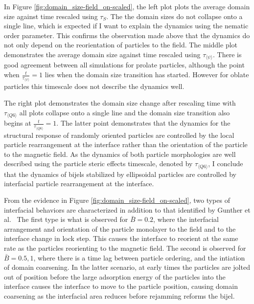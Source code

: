In Figure \ref{fig:domain_size-field_on-scaled}, the left plot plots the
average domain size against time rescaled using $\tau_S$. The
the domain sizes do not collapse onto a single line, which is expected
if I want to explain the dynamics using the nematic order parameter.
This confirms the observation made above that the dynamics do not only
depend on the reorientation of particles to the field. The middle plot
demonstrates the average domain size against time rescaled using
$\tau_{\langle \psi \rangle}$. There is good agreement
between all simulations for prolate particles, although the point when
$\frac{t}{\tau_{\langle \psi \rangle}} = 1$ lies when the domain size
transition has started. However for oblate particles this
timescale does not describe the dynamics well.

The right plot demonstrates the domain size change after rescaling time
with $\tau_{\langle Q6 \rangle}$ all plots collapse onto a single line and 
the domain size transition also begins at
$\frac{t}{\tau_{\langle Q6 \rangle}} = 1$. The latter point
demonstrates that the dynamics for the structural response of randomly
oriented particles are controlled by the local particle rearrangement at
the interface rather than the orientation of the particle to the
magnetic field. As the dynamics of both particle morphologies are well described
using the particle steric effects timescale, denoted by $\tau_{\langle Q6 \rangle}$,
I conclude that the dynamics of bijels stabilized by ellipsoidal particles are controlled by
interfacial particle rearrangement at the interface.

From the evidence in Figure \ref{fig:domain_size-field_on-scaled}, two
types of interfacial behaviors are characterized in addition to that
identified by Gunther et al.~\cite{gunther_timescales_2014} The first
type is what is observed for $\bar{B} = 0.2$, where the interfacial
arrangement and orientation of the particle monolayer to the field and to the
interface change in lock step. This causes the interface to reorient at
the same rate as the particles reorienting to the magnetic field. The
second is observed for $\bar{B} = 0.5, 1$, where there is a time lag
between particle ordering, and the intiation of domain coarsening. In
the latter scenario, at early times the particles are jolted out of
position before the large adsorption energy of the particles into the
interface causes the interface to move to the particle position, causing
domain coarsening as the interfacial area reduces before rejamming reforms the bijel.

